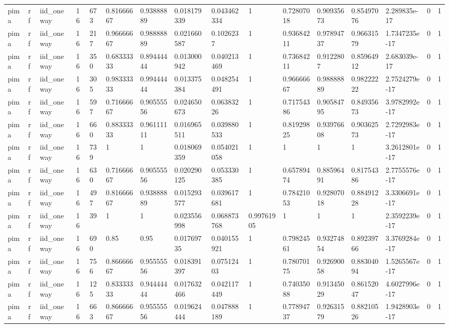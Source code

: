\begin{tabular}{llllllllllllllll}
pima & rf & iid\_oneway & 16 & 673 & 0.81666667 & 0.93888889 & 0.018179339 & 0.043462334 & 1 & 0.72807018 & 0.90935673 & 0.85497076 & 2.289835e-17 & 0 & 1 \\
pima & rf & iid\_oneway & 16 & 217 & 0.96666667 & 0.98888889 & 0.021660587 & 0.1026237 & 1 & 0.93684211 & 0.97894737 & 0.96631579 & 1.7347235e-17 & 0 & 1 \\
pima & rf & iid\_oneway & 16 & 350 & 0.68333333 & 0.89444444 & 0.013000942 & 0.040213469 & 1 & 0.73684211 & 0.9122807 & 0.85964912 & 2.683039e-17 & 0 & 1 \\
pima & rf & iid\_oneway & 16 & 305 & 0.98333333 & 0.99444444 & 0.013375384 & 0.048254491 & 1 & 0.96666667 & 0.98888889 & 0.98222222 & 2.7524279e-17 & 0 & 1 \\
pima & rf & iid\_oneway & 16 & 597 & 0.71666667 & 0.90555556 & 0.024650673 & 0.06383226 & 1 & 0.71754386 & 0.90584795 & 0.84935673 & 3.9782992e-17 & 0 & 1 \\
pima & rf & iid\_oneway & 16 & 660 & 0.88333333 & 0.96111111 & 0.016965511 & 0.039880533 & 1 & 0.81929825 & 0.93976608 & 0.90362573 & 2.7292983e-17 & 0 & 1 \\
pima & rf & iid\_oneway & 16 & 739 & 1 & 1 & 0.018069359 & 0.054021058 & 1 & 1 & 1 & 1 & 3.2612801e-17 & 0 & 1 \\
pima & rf & iid\_oneway & 16 & 630 & 0.71666667 & 0.90555556 & 0.020290125 & 0.053330385 & 1 & 0.65789474 & 0.88596491 & 0.81754386 & 2.7755576e-17 & 0 & 1 \\
pima & rf & iid\_oneway & 16 & 497 & 0.81666667 & 0.93888889 & 0.015293577 & 0.039617681 & 1 & 0.78421053 & 0.92807018 & 0.88491228 & 3.3306691e-17 & 0 & 1 \\
pima & rf & iid\_oneway & 16 & 39 & 1 & 1 & 0.023556998 & 0.068873768 & 0.99761905 & 1 & 1 & 1 & 2.3592239e-17 & 0 & 1 \\
pima & rf & iid\_oneway & 16 & 690 & 0.85 & 0.95 & 0.01769735 & 0.040155921 & 1 & 0.79824561 & 0.93274854 & 0.89239766 & 3.3769284e-17 & 0 & 1 \\
pima & rf & iid\_oneway & 16 & 756 & 0.86666667 & 0.95555556 & 0.018391397 & 0.07512403 & 1 & 0.78070175 & 0.92690058 & 0.88304094 & 1.5265567e-17 & 0 & 1 \\
pima & rf & iid\_oneway & 16 & 125 & 0.83333333 & 0.94444444 & 0.017632466 & 0.042117449 & 1 & 0.74035088 & 0.91345029 & 0.86152047 & 4.6027996e-17 & 0 & 1 \\
pima & rf & iid\_oneway & 16 & 663 & 0.86666667 & 0.95555556 & 0.019624444 & 0.047888189 & 1 & 0.77894737 & 0.92631579 & 0.88210526 & 1.9428903e-17 & 0 & 1 \\

\end{tabular}
